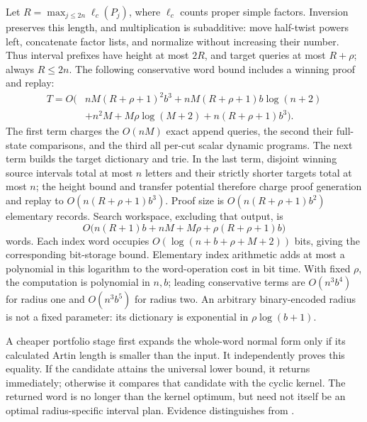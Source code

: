 Let $R=\max_{j\le2n}\ell_c(P_j)$, where $\ell_c$ counts proper simple
factors.  Inversion preserves this length, and multiplication is
subadditive: move half-twist powers left, concatenate factor lists, and
normalize without increasing their number.  Thus interval prefixes have
height at most $2R$, and target queries at most $R+\rho$; always $R\le2n$.
The following conservative word bound includes a winning proof and replay:
\begin{align*}
 T=O\bigl(&nM(R+\rho+1)^2b^3
       +nM(R+\rho+1)b\log(n+2)\\
       &+n^2M+M\rho\log(M+2)+n(R+\rho+1)b^3\bigr).
\end{align*}
The first term charges the $O(nM)$ exact append queries, the second their
full-state comparisons, and the third all per-cut scalar dynamic programs.
The next term builds the target dictionary and trie.  In the last term,
disjoint winning source intervals total at most $n$ letters and their
strictly shorter targets total at most $n$; the height bound and transfer
potential therefore charge proof generation and replay to
$O(n(R+\rho+1)b^3)$.  Proof size is
$O(n(R+\rho+1)b^2)$ elementary records.  Search workspace, excluding that
output, is
\[
 O\bigl(n(R+1)b+nM+M\rho+\rho(R+\rho+1)b\bigr)
\]
words.  Each index word occupies $O(\log(n+b+\rho+M+2))$ bits, giving
the corresponding bit-storage bound.  Elementary index arithmetic adds at
most a polynomial in this logarithm to the word-operation cost in bit time.  With fixed $\rho$, the computation is polynomial
in $n,b$; leading conservative terms are $O(n^3b^4)$ for radius one and
$O(n^3b^5)$ for radius two.  An arbitrary binary-encoded radius is not a
fixed parameter: its dictionary is exponential in $\rho\log(b+1)$.

A cheaper portfolio stage first expands the whole-word normal form only
if its calculated Artin length is smaller than the input.  It independently
proves this equality.  If the candidate attains the universal lower bound,
it returns immediately; otherwise it compares that candidate with the cyclic
kernel.  The returned word is no longer than the kernel optimum, but need
not itself be an optimal radius-specific interval plan.  Evidence distinguishes
 from .

